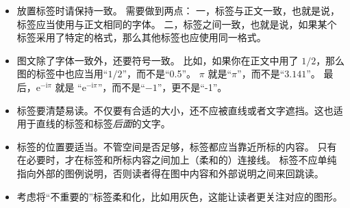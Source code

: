 \begin{itemize}
\item
  放置标签时请保持一致。
  需要做到两点：
  一，标签与正文一致，也就是说，标签应当使用与正文相同的字体。
  二，标签之间一致，也就是说，如果某个标签采用了特定的格式，那么其他标签也应使用同一格式。
\item
  图文除了字体一致外，还要符号一致。
  比如，如果你在正文中用了 $1/2$，那么图的标签中也应当用“$1/2$”，而不是“0.5”。
  $\pi$ 就是“$\pi$”，而不是“$3.141$”。
  最后，$\mathrm e^{-\mathrm i \pi}$ 就是 “$\mathrm e^{-\mathrm i \pi}$”，而不是“$-1$”，更不是“-1”。
\item
  标签要清楚易读。不仅要有合适的大小，还不应被直线或者文字遮挡。这也适用于直线的标签和标签\emph{后面}的文字。
\item
  标签的位置要适当。不管空间是否足够，标签都应当靠近所标的内容。
  只有在必要时，才在标签和所标内容之间加上（柔和的）连接线。
  标签不应单纯指向外部的图例说明，否则读者得在图中内容和外部说明之间来回跳读。
\item
  考虑将“不重要的”标签柔和化，比如用灰色，这能让读者更关注对应的图形。
\end{itemize}


